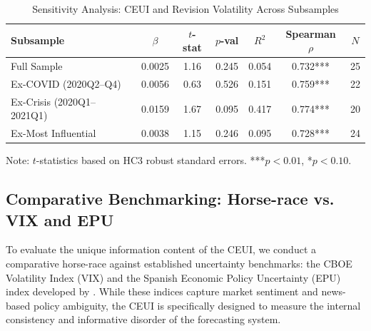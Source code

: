 \documentclass[12pt,a4paper]{article}
\theoremstyle{remark}
\begin{document}
\begin{table}[ht]
\centering
\begin{threeparttable}
\caption{Sensitivity Analysis: CEUI and Revision Volatility Across Subsamples}
\label{tab:influence_comparative}
\footnotesize
\begin{tabular}{lcccccc}
\toprule
Subsample & $\beta$ & $t$-stat & $p$-val & $R^2$ & Spearman $\rho$ & $N$ \\
\midrule
Full Sample                & 0.0025 & 1.16 & 0.245 & 0.054 & 0.732*** & 25 \\
Ex-COVID (2020Q2--Q4)      & 0.0056 & 0.63 & 0.526 & 0.151 & 0.759*** & 22 \\
Ex-Crisis (2020Q1--2021Q1) & 0.0159 & 1.67 & 0.095 & 0.417 & 0.774*** & 20 \\
Ex-Most Influential        & 0.0038 & 1.15 & 0.246 & 0.095 & 0.728*** & 24 \\
\bottomrule
\end{tabular}
\begin{tablenotes}
  \small \item Note: $t$-statistics based on HC3 robust standard errors. ***$p<0.01$, *$p<0.10$.
\end{tablenotes}
\end{threeparttable}
\end{table}

\subsection{Comparative Benchmarking: Horse-race vs. VIX and EPU}
\label{sec:horserace}

To evaluate the unique information content of the CEUI, we conduct a comparative horse-race against established uncertainty benchmarks: the CBOE Volatility Index (VIX) and the Spanish Economic Policy Uncertainty (EPU) index developed by \cite{ghirelli2021economic}. While these indices capture market sentiment and news-based policy ambiguity, the CEUI is specifically designed to measure the internal consistency and informative disorder of the forecasting system.
\end{document}
